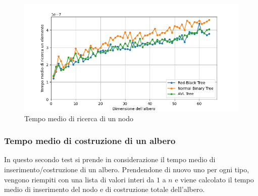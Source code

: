 \documentclass[a4paper,12pt]{article}
\begin{document}
    \begin{figure}[h]
        \centering
        \includegraphics[width=1\textwidth]{Tempo medio di ricerca}
        \caption{Tempo medio di ricerca di un nodo}
        \label{fig:esempio}
    \end{figure}

    \subsubsection{Tempo medio di costruzione di un albero}
    In questo secondo test si prende in considerazione il tempo medio di inserimento/costruzione di un albero.
    Prendendone di nuovo uno per ogni tipo, vengono riempiti con una lista di valori interi da $1$ a $n$ e viene
    calcolato il tempo medio di inserimento del nodo e di costruzione totale dell'albero.
\end{document}
